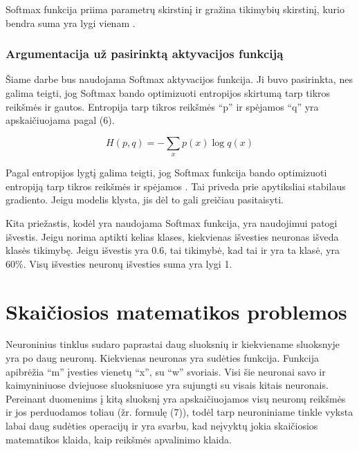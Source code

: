 \documentclass{VUMIFInfKursinis}
\begin{document}
\par
Softmax funkcija priima parametrų skirstinį ir gražina tikimybių skirstinį,
kurio bendra suma yra lygi vienam \cite{salt16}.

\subsubsection{Argumentacija už pasirinktą aktyvacijos funkciją}
\par
Šiame darbe bus naudojama Softmax aktyvacijos funkcija. Ji buvo
pasirinkta, nes galima teigti, jog Softmax bando optimizuoti entropijos
skirtumą tarp tikros reikšmės ir gautos. Entropija tarp tikros reikšmės
\enquote{p} ir spėjamos \enquote{q} yra apskaičiuojama pagal (6).

\begin{equation}
H(p, q) = - \sum_{x}p(x) \log q(x)
\end{equation}

\par
Pagal entropijos lygtį galima teigti, jog Softmax funkcija
bando optimizuoti entropiją tarp tikros reikšmės ir spėjamos \cite{salt6}.
Tai priveda prie apytiksliai stabilaus gradiento. Jeigu modelis klysta,
jis dėl to gali greičiau pasitaisyti.
\par
Kita priežastis, kodėl yra naudojama Softmax funkcija, yra naudojimui
patogi išvestis. Jeigu norima aptikti kelias klases, kiekvienas išvesties
neuronas išveda klasės tikimybę. Jeigu išvestis yra 0.6, tai tikimybė, kad tai ir
yra ta klasė, yra 60\%. Visų išvesties neuronų išvesties suma yra lygi 1.

\section{Skaičiosios matematikos problemos}
\par
Neuroninius tinklus sudaro paprastai daug sluoksnių ir kiekviename sluoksnyje yra po
daug neuronų. Kiekvienas neuronas yra sudėties funkcija. Funkcija apibrėžia \enquote{m} įvesties
vienetų \enquote{x}, su \enquote{w} svoriais. Visi šie neuronai savo ir kaimyniniuose dviejuose sluoksniuose
yra sujungti su visais kitais neuronais. Pereinant duomenims į kitą sluoksnį yra apskaičiuojamos
visų neuronų reikšmės ir jos perduodamos toliau (žr. formulę (7)), todėl tarp neuroniniame tinkle vyksta
labai daug sudėties operacijų ir yra svarbu, kad neįvyktų jokia skaičiosios matematikos klaida,
kaip reikšmės apvalinimo klaida.
\end{document}
